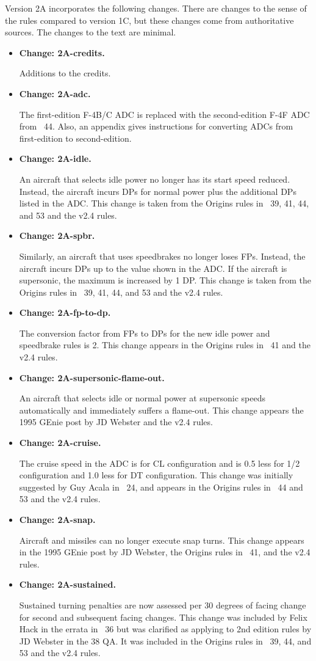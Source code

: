 \documentclass[10pt]{report}
\newcommand{\itemtag}[1]{\item \textbf{Change: #1.}\par}
\begin{document}
Version 2A incorporates the following changes. There are changes to the sense of the rules compared to version 1C, but these changes come from authoritative sources. The changes to the text are minimal.

\begin{itemize}

    \itemtag{2A-credits} Additions to the credits.

    \itemtag{2A-adc} The first-edition F-4B/C ADC is replaced with the second-edition F-4F ADC from {\APJ}~44. Also, an appendix gives instructions for converting ADCs from first-edition to second-edition.

    \itemtag{2A-idle} An aircraft that selects idle power no longer has its start speed reduced. Instead, the aircraft incurs DPs for normal power plus the additional DPs listed in the ADC. This change is taken from the Origins rules in {\APJ}~39, 41, 44, and 53 and the v2.4 rules. 

    \itemtag{2A-spbr} Similarly, an aircraft that uses speedbrakes no longer loses FPs. Instead, the aircraft incurs DPs up to the value shown in the ADC. If the aircraft is supersonic, the maximum is increased by 1 DP. This change is taken from the Origins rules in {\APJ}~39, 41, 44, and 53 and the v2.4 rules.

    \itemtag{2A-fp-to-dp} The conversion factor from FPs to DPs for the new idle power and speedbrake rules is 2. This change appears in the Origins rules in {\APJ}~41 and the v2.4 rules.

    \itemtag{2A-supersonic-flame-out} An aircraft that selects idle or normal power at supersonic speeds automatically and immediately suffers a flame-out. This change appears the 1995 GEnie post by JD Webster and the v2.4 rules.

    \itemtag{2A-cruise} The cruise speed in the ADC is for CL configuration and is 0.5 less for 1/2 configuration and 1.0 less for DT configuration. This change was initially suggested by Guy Acala in {\APJ}~24, and appears in the Origins rules in {\APJ}~44 and 53 and the v2.4 rules.

    \itemtag{2A-snap} Aircraft and missiles can no longer execute snap turns. This change appears in the 1995 GEnie post by JD Webster, the Origins rules in {\APJ}~41, and the v2.4 rules.

    \itemtag{2A-sustained} Sustained turning penalties are now assessed per 30 degrees of facing change for second and subsequent facing changes. This change was included by Felix Hack in the errata in {\APJ}~36 but was clarified as applying to 2nd edition rules by JD Webster in the {\APJ} 38 QA. It was included in the Origins rules in {\APJ}~39, 44, and 53 and the v2.4 rules.


\end{itemize}
\end{document}

